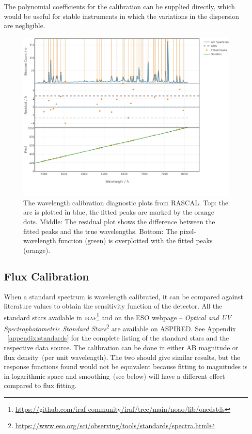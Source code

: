 \documentclass[twocolumn, linenumbers]{aastex631}
\begin{document}
The polynomial coefficients for the calibration can be supplied
directly, which would be useful for stable instruments in which
the variations in the dispersion are negligible.

\begin{figure}
    \centering
    \includegraphics[width=\columnwidth]{fig_05_wavelength_calibration_diagnostics.pdf}
    \caption{The wavelength calibration diagnostic plots from RASCAL.
    Top: the arc is plotted in blue, the fitted peaks are marked by
    the orange dots. Middle: The residual plot shows the difference
    between the fitted peaks and the true wavelengths. Bottom: The
    pixel-wavelength function (green) is overplotted with the fitted
    peaks (orange).}
    \label{fig:wavecal}
\end{figure}

\subsection{Flux Calibration}
When a standard spectrum is wavelength calibrated, it can be
compared against literature values to obtain the sensitivity
function of the detector. All the standard stars available in
\textsc{iraf}\footnote{\url{https://github.com/iraf-community/iraf/tree/main/noao/lib/onedstds}}
and on the ESO webpage -- \textit{Optical and UV Spectrophotometric
Standard Stars}\footnote{\url{https://www.eso.org/sci/observing/tools/standards/spectra.html}}
are available on \textsc{ASPIRED}. See Appendix ~\ref{appendix:standards} for
the complete listing of the standard stars and the respective data
source. The calibration can be done in either AB magnitude or
flux density~(per unit wavelength). The two should give similar
results, but the response functions found would not be equivalent
because fitting to magnitudes is in logarithmic space and smoothing~(see
below) will have a different effect compared to flux fitting.
\end{document}
